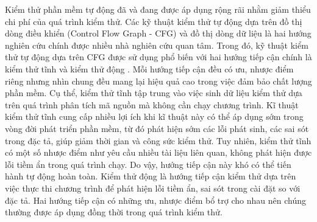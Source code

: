Kiểm thử phần mềm tự động đã và đang được áp dụng rộng rãi nhằm giảm thiểu chi phí của quá trình kiểm thử. Các kỹ thuật kiểm thử tự động dựa trên đồ thị dòng điều khiển (Control Flow Graph - CFG) và đồ thị dòng dữ liệu là hai hướng nghiên cứu chính được nhiều nhà nghiên cứu quan tâm. Trong đó, kỹ thuật kiểm thử tự động dựa trên CFG được sử dụng phổ biến với hai hướng tiếp cận chính là kiểm thử tĩnh \cite{SecureProgrammingWithStaticAnalysis, Buckle:1998:StaticAnalysisofSafetyCriticalSoftwareTechniquesToolsandExperiences} và kiểm thử động \cite{Grigorenko:1998:DynamicTesting, TUNG2022106821}. Mỗi hướng tiếp cận đều có ưu, nhược điểm riêng nhưng nhìn chung đều mang lại hiệu quả cao trong việc đảm bảo chất lượng phần mềm. Cụ thể, kiểm thử tĩnh tập trung vào việc sinh dữ liệu kiểm thử dựa trên quá trình phân tích mã nguồn mà không cần chạy chương trình. Kĩ thuật kiểm thử tĩnh cung cấp nhiều lợi ích khi kĩ thuật này có thể áp dụng sớm trong vòng đời phát triển phần mềm, từ đó phát hiện sớm các lỗi phát sinh, các sai sót trong đặc tả, giúp giảm thời gian và công sức kiểm thử. Tuy nhiên, kiểm thử tĩnh có một số nhược điểm như yêu cầu nhiều tài liệu liên quan, không phát hiện được lỗi tiềm ẩn trong quá trình chạy. Do vậy, hướng tiếp cận này khó có thể tiến hành tự động hoàn toàn. Kiểm thử động là hướng tiếp cận kiểm thử dựa trên việc thực thi chương trình để phát hiện lỗi tiềm ẩn, sai sót trong cài đặt so với đặc tả. Hai hướng tiếp cận có những ưu, nhược điểm bổ trợ cho nhau nên chúng thường được áp dụng đồng thời trong quá trình kiểm thử. 

